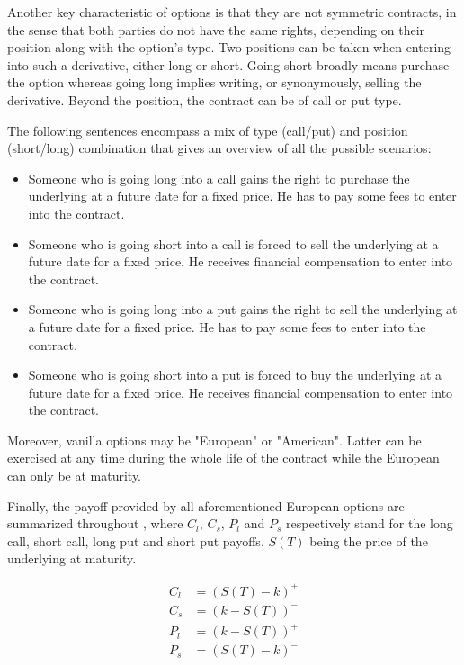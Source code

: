 \documentclass[12pt]{report}
\begin{document}
Another key characteristic of options is that they are not symmetric contracts, in the sense that both parties do not have the same rights, depending on their position along with the option's type. 
Two positions can be taken when entering into such a derivative, either long or short. 
Going short broadly means purchase the option whereas going long implies writing, or synonymously, selling the derivative. Beyond the position, the contract can be of call or put type. 

The following sentences encompass a mix of type (call/put) and position (short/long) combination that gives an overview of all the possible scenarios:

\begin{itemize}
\item Someone who is going long into a call gains the right to purchase the underlying at a future date for a fixed price. He has to pay some fees to enter into the contract.
\item Someone who is going short into a call is forced to sell the underlying at a future date for a fixed price. He receives financial compensation to enter into the contract.
\item Someone who is going long into a put gains the right to sell the underlying at a future date for a fixed price. He has to pay some fees to enter into the contract.
\item Someone who is going short into a put is forced to buy the underlying at a future date for a fixed price. He receives financial compensation to enter into the contract.
\end{itemize}

Moreover, vanilla options may be "European" or "American". Latter can be exercised at any time during the whole life of the contract while the European can only be at maturity.

Finally, the payoff provided by all aforementioned European options are summarized throughout , where $C_l$, $C_s$, $P_l$ and $P_s$ respectively stand for the long call, short call, long put and short put payoffs. $S(T)$ being the price of the underlying at maturity.

\begin{align}
C_l &= \left(S(T) - k\right)^+ \label{eq:upstream:cl}\\
C_s &= \left(k - S(T)\right)^- \label{eq:upstream:cs}\\
P_l &= \left(k - S(T)\right)^+ \label{eq:upstream:pl}\\
P_s &= \left(S(T) - k\right)^- \label{eq:upstream:ps}
\end{align}
\end{document}

